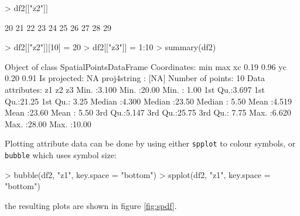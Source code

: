 \documentclass{article}
\begin{document}
\begin{Schunk}
\begin{Sinput}
> df2[["z2"]]
\end{Sinput}
\begin{Soutput}
 [1] 20 21 22 23 24 25 26 27 28 29

\end{Soutput}
\begin{Sinput}
> df2[["z2"]][10] = 20
> df2[["z3"]] = 1:10
> summary(df2)
\end{Sinput}
\begin{Soutput}
Object of class SpatialPointsDataFrame
Coordinates:
    min  max
xc 0.19 0.96
yc 0.20 0.91
Is projected: NA 
proj4string : [NA]
Number of points: 10
Data attributes:
       z1              z2              z3       
 Min.   :3.100   Min.   :20.00   Min.   : 1.00  
 1st Qu.:3.697   1st Qu.:21.25   1st Qu.: 3.25  
 Median :4.300   Median :23.50   Median : 5.50  
 Mean   :4.519   Mean   :23.60   Mean   : 5.50  
 3rd Qu.:5.147   3rd Qu.:25.75   3rd Qu.: 7.75  
 Max.   :6.620   Max.   :28.00   Max.   :10.00  

\end{Soutput}
\end{Schunk}
Plotting attribute data can be done by using either {\tt spplot} to
colour symbols, or {\tt bubble} which uses symbol size:
\begin{Schunk}
\begin{Sinput}
> bubble(df2, "z1", key.space = "bottom")
> spplot(df2, "z1", key.space = "bottom")
\end{Sinput}
\end{Schunk}
the resulting plots are shown in figure \ref{fig:spdf}.
\end{document}
